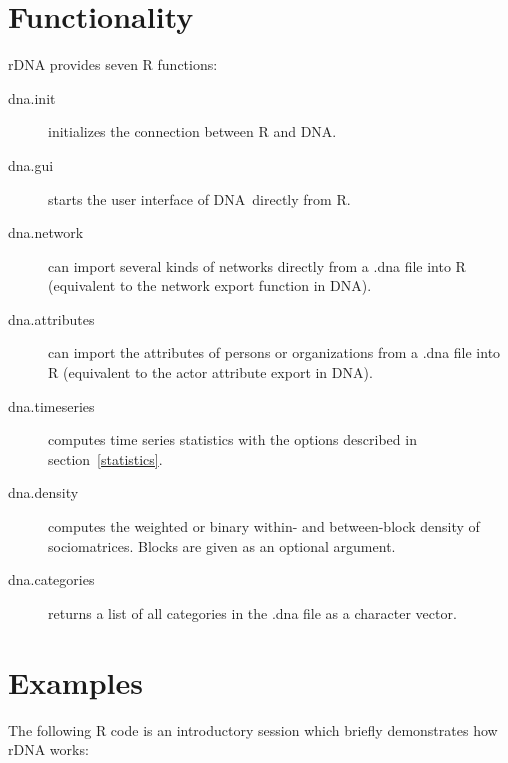 \documentclass[12pt,a4paper]{scrreprt}
\newcommand{\dnashort}{\textsc{DNA}}
\begin{document}
\section{Functionality}
rDNA provides seven R functions:
\begin{description}
 \item[dna.init] initializes the connection between R and \dnashort.
 \item[dna.gui] starts the user interface of \dnashort\ directly from R.
 \item[dna.network] can import several kinds of networks directly from a .dna file into R (equivalent to the network export function in \dnashort).
 \item[dna.attributes] can import the attributes of persons or organizations from a .dna file into R (equivalent to the actor attribute export in \dnashort).
 \item[dna.timeseries] computes time series statistics with the options described in section~\ref{statistics}.
 \item[dna.density] computes the weighted or binary within- and between-block density of sociomatrices. Blocks are given as an optional argument.
 \item[dna.categories] returns a list of all categories in the .dna file as a character vector.
\end{description}

\section{Examples}
The following R code is an introductory session which briefly demonstrates how rDNA works:

\end{document}
